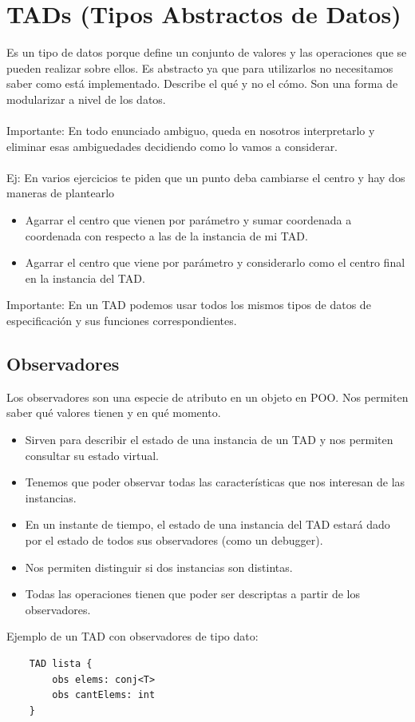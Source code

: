 \documentclass[10pt,a4paper]{article}
\begin{document}
\section*{TADs (Tipos Abstractos de Datos)}
Es un tipo de datos porque define un conjunto de valores y las operaciones que se pueden realizar sobre ellos. Es abstracto ya que para utilizarlos no necesitamos saber como está implementado.
Describe el qué y no el cómo.
Son una forma de modularizar a nivel de los datos.  \\ \\
Importante: En todo enunciado ambiguo, queda en nosotros interpretarlo y eliminar esas ambiguedades decidiendo como lo vamos a considerar.\\ \\
Ej: En varios ejercicios te piden que un punto deba cambiarse el centro y hay dos maneras de plantearlo
\begin{itemize}
    \item Agarrar el centro que vienen por parámetro y sumar coordenada a coordenada con respecto a las de la instancia de mi TAD. 
    \item Agarrar el centro que viene por parámetro y considerarlo como el centro final en la instancia del TAD.
\end{itemize}
Importante: En un TAD podemos usar todos los mismos tipos de datos de especificación y sus funciones correspondientes.

\subsection*{Observadores}
Los observadores son una especie de atributo en un objeto en POO.
Nos permiten saber qué valores tienen y en qué momento.
\begin{itemize}
    \item Sirven para describir el estado de una instancia de un TAD y nos permiten consultar su estado virtual.
    \item Tenemos que poder observar todas las características que nos interesan de las instancias.
    \item En un instante de tiempo, el estado de una instancia del TAD estará dado por el estado de todos sus observadores (como un debugger).
    \item Nos permiten distinguir si dos instancias son distintas.
    \item Todas las operaciones tienen que poder ser descriptas a partir de los observadores.
\end{itemize} 
Ejemplo de un TAD con observadores de tipo dato:
\begin{lstlisting}
    TAD lista {
        obs elems: conj<T>
        obs cantElems: int
    }
\end{lstlisting}
\end{document}

